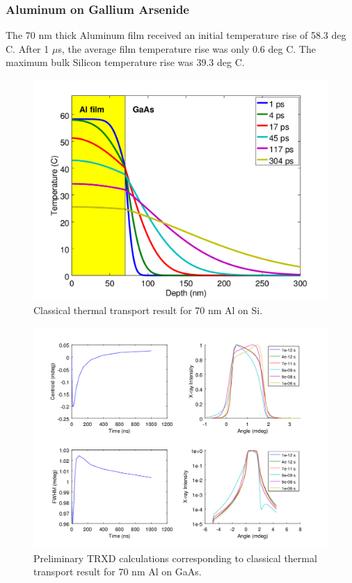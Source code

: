 \documentclass[letterpaper,11pt]{article}
\begin{document}
\subsubsection{Aluminum on Gallium Arsenide}
The 70 nm thick Aluminum film received an initial temperature rise of 58.3 deg C. After 1 $\mu$s, the average film temperature rise was only 0.6 deg C.  The maximum bulk Silicon temperature rise was 39.3 deg C.
\begin{figure}
\includegraphics[scale = 0.65]{GaAs_Temp.png}
\caption{Classical thermal transport result for 70 nm Al on Si.}
\end{figure}
\begin{figure}
\includegraphics[scale = 0.65]{GaAs_TRXD.png}
\caption{Preliminary TRXD calculations corresponding to classical thermal transport result for 70 nm Al on GaAs.}
\end{figure}
\newpage
\end{document}
